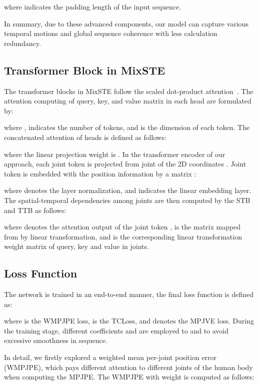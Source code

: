 \documentclass[10pt,twocolumn,letterpaper]{article}
\begin{document}
	where  indicates the padding length of the input sequence.
	
	In summary, due to these advanced components, our model can capture various temporal motions and global sequence coherence with less calculation redundancy.
	
\subsection{Transformer Block in MixSTE}
	\label{sec:stb&ttb}
	The transformer blocks in MixSTE follow the scaled dot-product attention~\cite{attisalluneed}. The attention computing of query, key, and value matrix  in each head are formulated by:
	
	where ,  indicates the number of tokens, and  is the dimension of each token.
	The concatenated attention of  heads is defined as follows:
	
	
	where the linear projection weight is .
	In the transformer encoder of our approach, each joint token  is projected from joint  of the 2D coordinates . 
	Joint token  is embedded with the position information by a matrix :
	
	where  denotes the layer normalization, and  indicates the linear embedding layer.
	The spatial-temporal dependencies among joints are then computed by the STB and TTB as follows:

	
	where  denotes the attention output of the joint token ,  is the matrix mapped from  by linear transformation, and  is the corresponding linear transformation weight matrix of query, key and value in joints.
	




	\subsection{Loss Function}
	\label{sec:multiloss}
The network is trained in an end-to-end manner, the final loss function  is defined as:
	
	where  is the WMPJPE loss,  is the TCLoss, and  denotes the MPJVE loss. 
	During the training stage, different coefficients  and  are employed to  and  to avoid excessive smoothness in sequence. 
	
In detail, we firstly explored a weighted mean per-joint position error (WMPJPE), which pays different attention to different joints of the human body when computing the MPJPE.
	The WMPJPE  with weight  is computed as follows:
\end{document}

